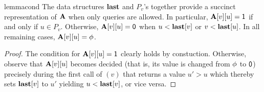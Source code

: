 \iffalse
\begin{restatable}{lemma}{cond}\label{lem:cond-0}
Assuming that only \func{Next-Neighbor} queries are allowed, consider $u > \LAST[v]$. Then, $\ADJ[v][u] = \ZERO$ if and only if $\LAST[u] > v$ and $u \notin P_v$.
\end{restatable}
\begin{proof}
\label{proof:cond-0}
If $\ADJ[v][u] = \ZERO$ while $\LAST[v] < u$, then the coin-flip for $X_{v,u}$ must have been performed during some call \func{Next-Neighbor}$(u)$ returning a value $v' > v$: $\LAST[u]$ is increased to $v' > v$ right before the return. Further, $v$ could not have been returned from \func{Next-Neighbor}$(u)$ at any time because $X_{v,u}=\ZERO$, and thus $u$ is never added to $P_v$.

Similarly, if $\LAST[u] > v$ then $X_{v,u}$ is already determined. Further, suppose to the contrary that $X_{v,u} = \ONE$, then $v$ must have been returned in a \func{Next-Neighbor}$(u)$ call. As we still have $u > \LAST[v]$ and $\LAST[v]$ can never decrease, $u$ must have been added to $P_v$ during that call and not removed yet, contradicting $u \notin P_v$.
\end{proof}
Combined with the fact that all entries $\ADJ[v][u]$ for $u < \LAST[v]$ has been revealed (by as a result of repeatedly invoking \func{Next-Neighbor}$(v)$), we conclude that $\LAST$ and $P_v$'s fully represent $\ADJ$.
\fi
\begin{restatable}{lemma}{cond}\label{lem:cond-0}
The data structures $\LAST$ and $P_v$'s together provide a succinct representation of $\ADJ$ when only  queries are allowed. In particular, $\mathbf{A}[v][u]=\mathsf{1}$ if and only if $u \in P_v$. Otherwise, $\ADJ[v][u]=\ZERO$ when $u <\LAST[v]$ or $v < \mathbf{last}[u]$. In all remaining cases, $\mathbf{A}[v][u]=\phi$.
\end{restatable}
\begin{proof}
The condition for $\mathbf{A}[v][u]=\mathsf{1}$ clearly holds by constuction. Otherwise, observe that $\ADJ[v][u]$ becomes decided (that is, its value is changed from $\phi$ to $\mathsf{0}$) precisely during the first call of $(v)$ that returns a value $u' > u$ which thereby sets $\LAST[v]$ to $u'$ yielding $u<\LAST[v]$, or vice versa.
\end{proof}

